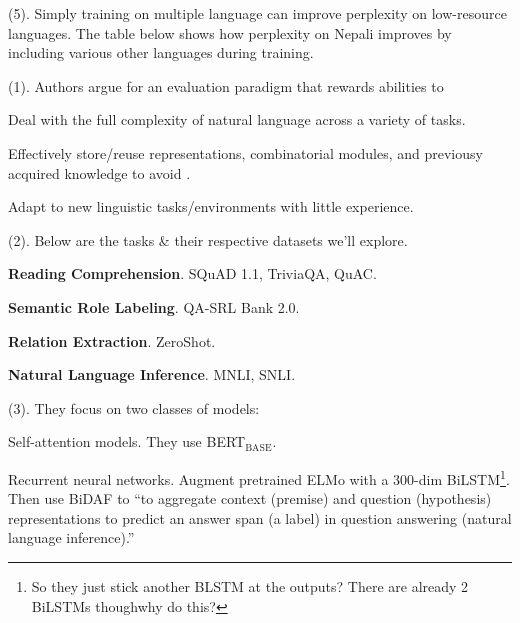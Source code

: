 \documentclass[11pt]{article}
\begin{document}
 (5). Simply training on multiple language can improve perplexity on low-resource languages. The table below shows how perplexity on Nepali improves by including various other languages during training.






 (1). Authors argue for an evaluation paradigm that rewards abilities to
\begin{compactenum}
	\item Deal with the full complexity of natural language across a variety of tasks.
	\item Effectively store/reuse representations, combinatorial modules, and previousy acquired knowledge to avoid .
	\item Adapt to new linguistic tasks/environments with little experience.
\end{compactenum}

 (2). Below are the tasks \& their respective datasets we'll explore. 
\begin{compactitem}
	\item \textbf{Reading Comprehension}. SQuAD 1.1, TriviaQA, QuAC. 
	\item \textbf{Semantic Role Labeling}. QA-SRL Bank 2.0. 
	\item \textbf{Relation Extraction}. ZeroShot. 
	\item \textbf{Natural Language Inference}. MNLI, SNLI. 
\end{compactitem}

 (3). They focus on two classes of models:
\begin{compactitem}
	\item Self-attention models. They use BERT$_{\text{BASE}}$.
	\item Recurrent neural networks. Augment pretrained ELMo with a 300-dim BiLSTM\footnote{So they just stick another BLSTM at the outputs? There are already 2 BiLSTMs though\textellipsis why do this?}. Then use BiDAF to ``to aggregate context (premise) and question (hypothesis) representations to predict an answer span (a label) in question answering (natural language inference).''
\end{compactitem}
\end{document}

